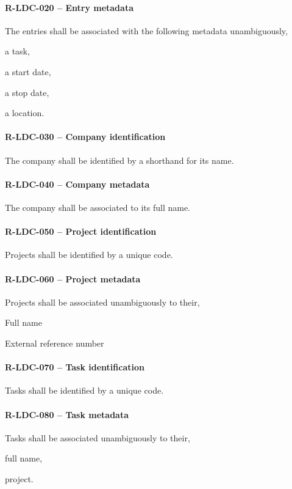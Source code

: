 \paragraph{R-LDC-020 -- Entry metadata}
The entries shall be associated with the following metadata unambiguously,
\begin{compactitem}
\item a task,
\item a start date,
\item a stop date,
\item a location.
\end{compactitem}

\paragraph{R-LDC-030 -- Company identification}
The company shall be identified by a shorthand for its name.

\paragraph{R-LDC-040 -- Company metadata}
The company shall be associated to its full name.

\paragraph{R-LDC-050 -- Project identification}
Projects shall be identified by a unique code.

\paragraph{R-LDC-060 -- Project metadata}
Projects shall be associated unambiguously to their,
\begin{compactitem}
  \item Full name
  \item External reference number
\end{compactitem}

\paragraph{R-LDC-070 -- Task identification}
Tasks shall be identified by a unique code.

\paragraph{R-LDC-080 -- Task metadata}
Tasks shall be associated unambiguously to their,
\begin{compactitem}
  \item full name,
  \item project.
\end{compactitem}

